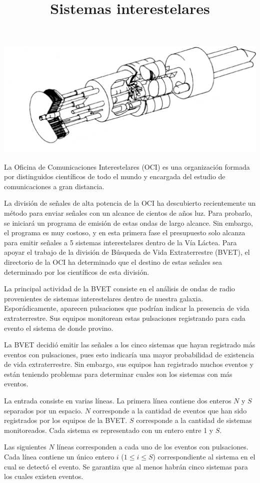 \documentclass{oci}
\title{Sistemas interestelares}
\begin{document}
\begin{problemDescription}
\begin{center}
\includegraphics[scale=0.3]{interestellar.png}
\end{center}
La Oficina de Comunicaciones Interestelares (OCI) es una organización formada por distinguidos científicos de todo el mundo y encargada del estudio de comunicaciones a gran distancia.

La división de señales de alta potencia de la OCI ha descubierto recientemente un método para enviar señales con un alcance de cientos de años luz.
Para probarlo, se iniciará un programa de emisión de estas ondas de largo alcance.
Sin embargo, el programa es muy costoso, y en esta primera fase el presupuesto solo alcanza para emitir señales a 5 sistemas interestelares dentro de la Vía Láctea.
Para apoyar el trabajo de la división de Búsqueda de Vida Extraterrestre (BVET), el directorio de la OCI ha determinado que el destino de estas señales sea determinado por los científicos de esta división.

La principal actividad de la BVET consiste en el análisis de ondas de radio provenientes de sistemas interestelares dentro de nuestra galaxia.
Esporádicamente, aparecen pulsaciones que podrían indicar la presencia de vida extraterrestre.
Sus equipos monitorean estas pulsaciones registrando para cada evento el sistema de donde provino.

La BVET decidió emitir las señales a los cinco sistemas que hayan registrado más eventos con pulsaciones, pues esto indicaría una mayor probabilidad de existencia de vida extraterrestre.
Sin embargo, sus equipos han registrado muchos eventos y están teniendo problemas para determinar cuales son los sistemas con más eventos.

\end{problemDescription}

\begin{inputDescription}
La entrada consiste en varias líneas.
La primera línea contiene dos enteros $N$ y $S$ separados por un espacio.
$N$ corresponde a la cantidad de eventos que han sido registrados por los equipos de la BVET.
$S$ corresponde a la cantidad de sistemas monitoreados.
Cada sistema es representado con un entero entre 1 y $S$.

Las siguientes $N$ líneas corresponden a cada uno de los eventos con pulsaciones.
Cada línea contiene un único entero $i$ ($1 \le i \le S$) correspondiente al sistema en el cual se detectó el evento.
Se garantiza que al menos habrán cinco sistemas para los cuales existen eventos.
\end{inputDescription}
\end{document}
